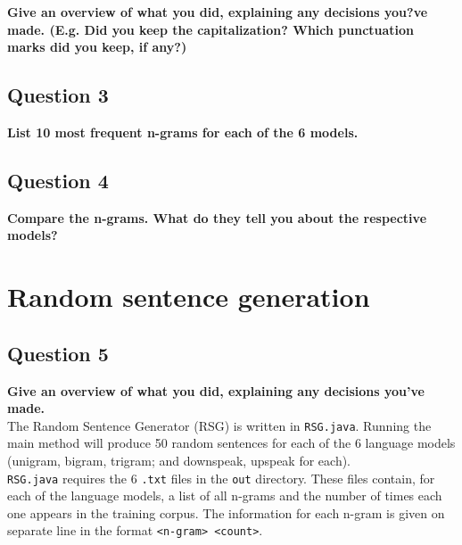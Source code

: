 \documentclass{article} %
\begin{document}
\textbf{Give an overview of what you did, explaining any decisions you?ve made. (E.g. Did you keep the capitalization? Which punctuation marks did you keep, if any?)}
\\


\lipsum[2] %

\subsection*{Question 3}

\textbf{List 10 most frequent n-grams for each of the 6 models.}
\\


\lipsum[2] %

\subsection*{Question 4}

\textbf{Compare the n-grams. What do they tell you about the respective
models?}
\\


\lipsum[2] %

\section{Random sentence generation}
\subsection*{Question 5}

\textbf{Give an overview of what you did, explaining any decisions you've made.}
\\

The Random Sentence Generator (RSG) is written in \texttt{RSG.java}. Running the main method will produce 50 random sentences for each of the 6 language models (unigram, bigram, trigram; and downspeak, upspeak for each).\\

\texttt{RSG.java} requires the 6 \texttt{.txt} files in the \texttt{out} directory. These files contain, for each of the language models, a list of all n-grams and the number of times each one appears in the training corpus. The information for each n-gram is given on separate line in the format  \texttt{<n-gram> <count>}.\\
\end{document}
